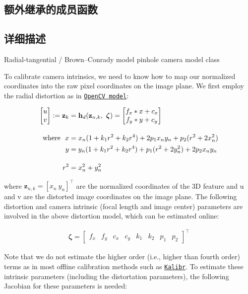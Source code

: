 \subsection*{额外继承的成员函数}


\subsection{详细描述}
Radial-\/tangential / Brown–\+Conrady model pinhole camera model class 

To calibrate camera intrinsics, we need to know how to map our normalized coordinates into the raw pixel coordinates on the image plane. We first employ the radial distortion as in \href{https://docs.opencv.org/3.4/da/d54/group__imgproc__transform.html#details}{\tt Open\+CV model}\+:

\begin{align*} \begin{bmatrix} u \\ v \end{bmatrix}:= \mathbf{z}_k &= \mathbf h_d(\mathbf{z}_{n,k}, ~\boldsymbol\zeta) = \begin{bmatrix} f_x * x + c_x \\ f_y * y + c_y \end{bmatrix}\\[1em] \empty {\rm where}~~ x &= x_n (1 + k_1 r^2 + k_2 r^4) + 2 p_1 x_n y_n + p_2(r^2 + 2 x_n^2) \\\ y &= y_n (1 + k_1 r^2 + k_2 r^4) + p_1 (r^2 + 2 y_n^2) + 2 p_2 x_n y_n \\[1em] r^2 &= x_n^2 + y_n^2 \end{align*}

where $ \mathbf{z}_{n,k} = [ x_n ~ y_n ]^\top$ are the normalized coordinates of the 3D feature and u and v are the distorted image coordinates on the image plane. The following distortion and camera intrinsic (focal length and image center) parameters are involved in the above distortion model, which can be estimated online\+:

\begin{align*} \boldsymbol\zeta = \begin{bmatrix} f_x & f_y & c_x & c_y & k_1 & k_2 & p_1 & p_2 \end{bmatrix}^\top \end{align*}

Note that we do not estimate the higher order (i.\+e., higher than fourth order) terms as in most offline calibration methods such as \href{https://github.com/ethz-asl/kalibr}{\tt Kalibr}. To estimate these intrinsic parameters (including the distortation parameters), the following Jacobian for these parameters is needed\+:

